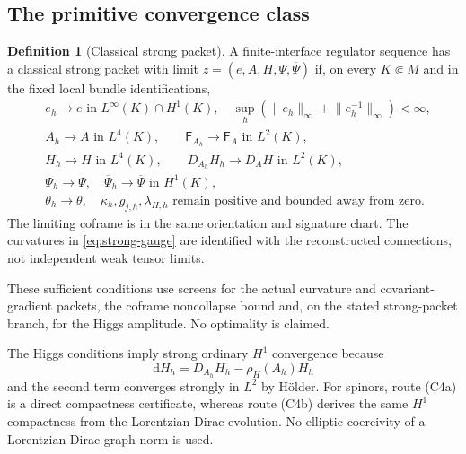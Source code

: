 \documentclass[11pt]{article}
\numberwithin{equation}{section}
\theoremstyle{definition}
\newtheorem{definition}[definition]{Definition}
\theoremstyle{remark}
\newcommand{\dd}{\mathrm d}
\newcommand{\norm}[1]{\lVert#1\rVert}
\newcommand{\Fcurv}{\mathsf F}
\newcommand{\bPsi}{\overline\Psi}
\begin{document}
\subsection{The primitive convergence class}

\begin{definition}[Classical strong packet]
\label{def:strong-packet}
A finite-interface regulator sequence has a classical strong packet with limit $z=(e,A,H,\Psi,\bPsi)$ if, on every $K\Subset M$ and in the fixed local bundle identifications,
\begin{align}
 &e_h\to e\text{ in }L^\infty(K)\cap H^1(K),
 \quad \sup_h(\norm{e_h}_\infty+\norm{e_h^{-1}}_\infty)<\infty,
 \label{eq:strong-geometry}\\
 &A_h\to A\text{ in }L^4(K),
 \qquad \Fcurv_{A_h}\to\Fcurv_A\text{ in }L^2(K),
 \label{eq:strong-gauge}\\
 &H_h\to H\text{ in }L^4(K),
 \qquad D_{A_h}H_h\to D_AH\text{ in }L^2(K),
 \label{eq:strong-Higgs}\\
 &\Psi_h\to\Psi,\quad\bPsi_h\to\bPsi
       \text{ in }H^1(K),
 \label{eq:strong-spinors}\\
 &\theta_h\to\theta,
 \quad \kappa_h,g_{j,h},\lambda_{H,h}\text{ remain positive and bounded away from zero}.
 \label{eq:strong-parameters}
\end{align}
The limiting coframe is in the same orientation and signature chart. The curvatures in \eqref{eq:strong-gauge} are identified with the reconstructed connections, not independent weak tensor limits.
\end{definition}

These sufficient conditions use screens for the actual curvature and
covariant-gradient packets, the coframe noncollapse bound and, on the
stated strong-packet branch,  for the Higgs amplitude.
No optimality is claimed.

The Higgs conditions imply strong ordinary $H^1$ convergence because
\[
 \dd H_h=D_{A_h}H_h-\rho_H(A_h)H_h
\]
and the second term converges strongly in $L^2$ by H\"older. For spinors, route \textup{(C4a)} is a direct compactness certificate, whereas route \textup{(C4b)} derives the same $H^1$ compactness from the Lorentzian Dirac evolution. No elliptic coercivity of a Lorentzian Dirac graph norm is used.
\end{document}
